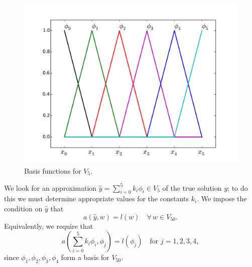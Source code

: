 \begin{figure}[ht]
\centering
\includegraphics[width=\textwidth]{basis_functions.pdf}
\caption{Basis functions for $V_5$.}
\label{fig:FEM_basis_functions}
\end{figure}

We look for an approximation $\hat{y} = \sum_{i=0}^5 k_i \phi_i \in V_5$ of the true solution $y$; to do this we must determine appropriate values for the constants $k_i$.
We impose the condition on $\hat{y}$ that 
\[a(\hat{y},w) = l(w) \quad \forall \, w \in V_{50}.\]
Equivalently, we require that 
\[a \left( \sum_{i=0}^5 k_i \phi_i,\phi_j \right) = l(\phi_j) \quad \text{for } j = 1,2,3,4,\]
since $\phi_1, \phi_2, \phi_3, \phi_4$ form a basis for $V_{50}$.


